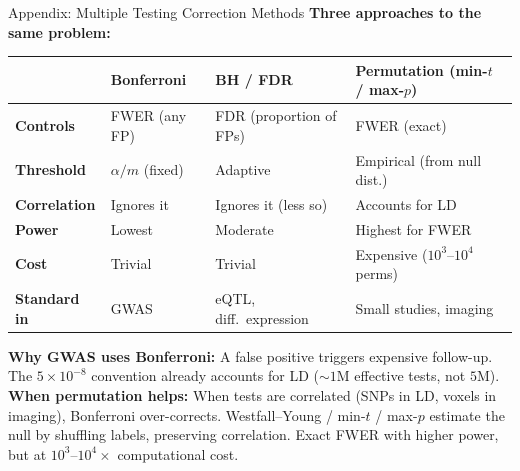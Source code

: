 \documentclass[aspectratio=169,10pt]{beamer}
\begin{document}
\begin{frame}{Appendix: Multiple Testing Correction Methods}
\textbf{Three approaches to the same problem:}

\vspace{0.2em}
\begin{center}
{\footnotesize
\renewcommand{\arraystretch}{1.15}
\begin{tabular}{p{2cm}p{3.2cm}p{3.2cm}p{3.4cm}}
\toprule
& \textbf{Bonferroni} & \textbf{BH / FDR} & \textbf{Permutation (min-$t$ / max-$p$)} \\
\midrule
\textbf{Controls} & FWER (any FP) & FDR (proportion of FPs) & FWER (exact) \\
\textbf{Threshold} & $\alpha / m$ (fixed) & Adaptive & Empirical (from null dist.) \\
\textbf{Correlation} & Ignores it & Ignores it (less so) & Accounts for LD \\
\textbf{Power} & Lowest & Moderate & Highest for FWER \\
\textbf{Cost} & Trivial & Trivial & Expensive ($10^3$--$10^4$ perms) \\
\textbf{Standard in} & GWAS & eQTL, diff.\ expression & Small studies, imaging \\
\bottomrule
\end{tabular}}
\end{center}

\vspace{0.1em}
{\footnotesize \textbf{Why GWAS uses Bonferroni:} A false positive triggers expensive follow-up. The $5 \times 10^{-8}$ convention already accounts for LD (${\sim}1$M effective tests, not $5$M).
\textbf{When permutation helps:} When tests are correlated (SNPs in LD, voxels in imaging), Bonferroni over-corrects. Westfall--Young / min-$t$ / max-$p$ estimate the null by shuffling labels, preserving correlation. Exact FWER with higher power, but at $10^3$--$10^4\times$ computational cost.}
\end{frame}
\end{document}
